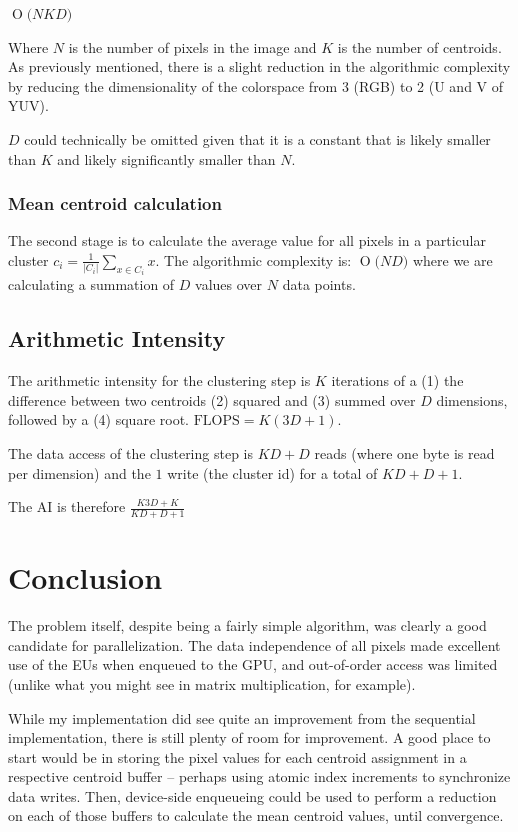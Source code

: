 \documentclass[11pt]{article}
\newcommand{\BigO}[1]{\ensuremath{\operatorname{O}\bigl(#1\bigr)}}
\begin{document}
$\BigO{NKD}$

Where $N$ is the number of pixels in the image and $K$ is the number of centroids. As
previously mentioned, there is a slight reduction in the algorithmic complexity by
reducing the dimensionality of the colorspace from 3 (RGB) to 2 (U and V of YUV).

$D$ could technically be omitted given that it is a constant that is likely smaller
than $K$ and likely significantly smaller than $N$.

\subsubsection{Mean centroid calculation}

The second stage is to calculate the average value for all pixels in a particular 
cluster $c_i = \frac{1}{|C_i|}\sum_{x \in C_i}x$. The algorithmic complexity is: $\BigO{ND}$ 
where we are calculating a summation of $D$ values over $N$ data points.

\subsection{Arithmetic Intensity}

The arithmetic intensity for the clustering step is $K$ iterations of a (1) the difference 
between two centroids (2) squared and (3) summed over $D$ dimensions, followed by a (4) 
square root. $\text{FLOPS} = K(3D+1)$.

The data access of the clustering step is $KD+D$ reads (where one byte is read per dimension)
and the $1$ write (the cluster id) for a total of $KD+D+1$.

The AI is therefore $\frac{K3D+K}{KD+D+1}$

\section{Conclusion}

The problem itself, despite being a fairly simple algorithm, was clearly a good candidate for 
parallelization. The data independence of all pixels made excellent use of the EUs when enqueued
to the GPU, and out-of-order access was limited (unlike what you might see in matrix multiplication,
for example).

While my implementation did see quite an improvement from the sequential implementation, there is still
plenty of room for improvement. A good place to start would be in storing the pixel values for each 
centroid assignment in a respective centroid buffer -- perhaps using atomic index increments to synchronize
data writes. Then, device-side enqueueing could be used to perform a reduction on each of those buffers
to calculate the mean centroid values, until convergence.
\end{document}
